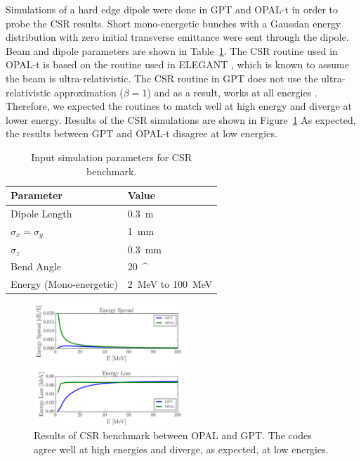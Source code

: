 Simulations of a hard edge dipole were done in GPT  
and OPAL-t in order to probe the CSR results.
Short mono-energetic bunches with a Gaussian energy distribution with zero initial transverse emittance  
were sent through the dipole.  Beam and dipole parameters are shown in Table~\ref{tab:benchcsr}. 
The CSR routine used in OPAL-t is based on the routine used in ELEGANT \cite{elegant}, 
which is known to assume the beam is ultra-relativistic. The CSR routine in GPT  
does not use the ultra-relativistic approximation ($\beta=1$) 
and as a result, works at all energies \cite{gptcsr}.  
Therefore, we expected the routines to match well at high energy and  
diverge at lower energy. Results of the CSR simulations are shown in Figure~\ref{fig:csr}  
As expected, the results between GPT and OPAL-t disagree at low energies. 
\begin{table}
	\begin{center}
		\caption{Input simulation parameters for CSR benchmark.}
		\label{tab:benchcsr}
		\begin{tabular}{l l} 
			\toprule
			\toprule
			\textbf{Parameter} & \textbf{Value} \\ 
			\midrule
			Dipole Length & \SI{0.3}{m} \\
			$\sigma_x =\sigma_y$ & \SI{1}{mm} \\
			$\sigma_z$ 			 & \SI{0.3}{mm} \\
			Bend Angle 			 & \SI{20}{^\circ} \\
			Energy (Mono-energetic)	 & \SI{2}{MeV} to \SI{100}{MeV} \\
			\bottomrule			
		\end{tabular}
	\end{center}
\end{table}
\begin{figure}
	\centering
	\includegraphics[width=0.5\textwidth]{./images/CSR}
	\caption{Results of CSR benchmark between OPAL and GPT.
	The codes agree well at high energies and diverge, as expected, at low energies.}
	\label{fig:csr}
\end{figure}

